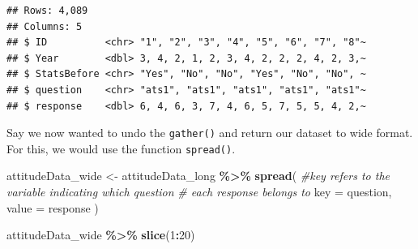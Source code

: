 \documentclass[
  12pt,
]{book}
\newenvironment{Shaded}{\begin{snugshade}}{\end{snugshade}}
\newcommand{\AttributeTok}[1]{\textcolor[rgb]{0.13,0.29,0.53}{#1}}
\newcommand{\CommentTok}[1]{\textcolor[rgb]{0.56,0.35,0.01}{\textit{#1}}}
\newcommand{\DecValTok}[1]{\textcolor[rgb]{0.00,0.00,0.81}{#1}}
\newcommand{\FunctionTok}[1]{\textcolor[rgb]{0.13,0.29,0.53}{\textbf{#1}}}
\newcommand{\NormalTok}[1]{#1}
\newcommand{\OtherTok}[1]{\textcolor[rgb]{0.56,0.35,0.01}{#1}}
\newcommand{\SpecialCharTok}[1]{\textcolor[rgb]{0.81,0.36,0.00}{\textbf{#1}}}
\begin{document}
\begin{verbatim}
## Rows: 4,089
## Columns: 5
## $ ID          <chr> "1", "2", "3", "4", "5", "6", "7", "8"~
## $ Year        <dbl> 3, 4, 2, 1, 2, 3, 4, 2, 2, 2, 4, 2, 3,~
## $ StatsBefore <chr> "Yes", "No", "No", "Yes", "No", "No", ~
## $ question    <chr> "ats1", "ats1", "ats1", "ats1", "ats1"~
## $ response    <dbl> 6, 4, 6, 3, 7, 4, 6, 5, 7, 5, 5, 4, 2,~
\end{verbatim}

Say we now wanted to undo the \texttt{gather()} and return our dataset to wide format. For this, we would use the function \texttt{spread()}.

\begin{Shaded}
\begin{Highlighting}[]
\NormalTok{attitudeData\_wide }\OtherTok{\textless{}{-}}
\NormalTok{  attitudeData\_long }\SpecialCharTok{\%\textgreater{}\%} 
  \FunctionTok{spread}\NormalTok{(}
    \CommentTok{\#key refers to the variable indicating which question }
    \CommentTok{\# each response belongs to}
    \AttributeTok{key =}\NormalTok{ question, }
    \AttributeTok{value =}\NormalTok{ response}
\NormalTok{  )}

\NormalTok{attitudeData\_wide }\SpecialCharTok{\%\textgreater{}\%} 
  \FunctionTok{slice}\NormalTok{(}\DecValTok{1}\SpecialCharTok{:}\DecValTok{20}\NormalTok{)}
\end{Highlighting}
\end{Shaded}
\end{document}
